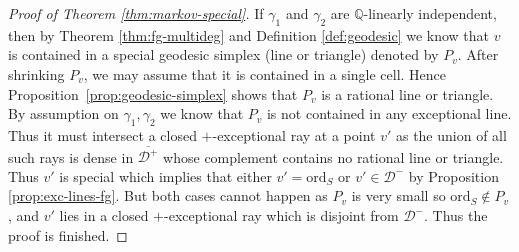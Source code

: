 \documentclass[reqno, 12pt]{amsart}
\theoremstyle{definition}
\newcommand{\bA}{\mathbb{A}}
\newcommand{\bQ}{\mathbb{Q}}
\newcommand{\cD}{\mathcal{D}}
\newcommand{\ord}{\mathrm{ord}}
\numberwithin{equation}{section}
\newcommand{\YL}[1]{{\textcolor{blue}{[Yuchen: #1]}}}
\begin{document}
\begin{proof}[Proof of Theorem \ref{thm:markov-special}]
If $\gamma_1$ and $\gamma_2$ are $\bQ$-linearly independent, then by Theorem \ref{thm:fg-multideg} and Definition \ref{def:geodesic} we know that $v$ is contained in a special geodesic simplex (line or triangle) denoted by $P_v$. After shrinking $P_v$, we may assume that it is contained
in a single cell. Hence Proposition~\ref{prop:geodesic-simplex} shows that $P_v$
is a rational line or triangle.
By assumption on $\gamma_1, \gamma_2$ we know that $P_v$ is not contained in any exceptional line. Thus it must intersect a closed $+$-exceptional ray at a point $v'$ as the union of all such rays is dense in $\overline{\cD^+}$ whose complement contains no rational line or triangle. Thus $v'$ is special which implies that either $v'=\ord_S$ or $v'\in \cD^-$ by Proposition \ref{prop:exc-lines-fg}. But both cases cannot happen as $P_v$ is very small so $\ord_S\not\in P_v$, and $v'$ lies in a closed $+$-exceptional ray which is disjoint from $\cD^-$. Thus the proof is finished. 
\end{proof}
\end{document}
